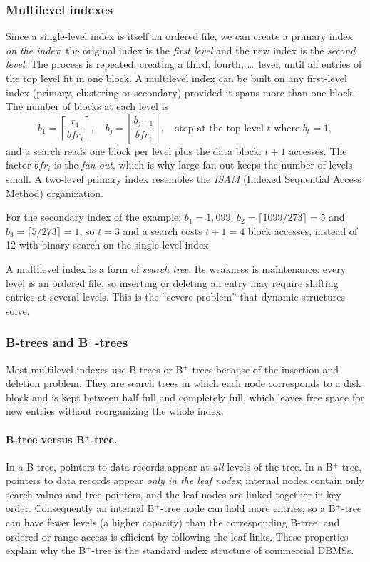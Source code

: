 \subsubsection{Multilevel indexes}
\label{sec:multilevel}
Since a single-level index is itself an ordered file, we can create a primary index \emph{on the
index}: the original index is the \emph{first level} and the new index is the \emph{second level}.
The process is repeated, creating a third, fourth, \dots\ level, until all entries of the top level
fit in one block. A multilevel index can be built on any first-level index (primary, clustering or
secondary) provided it spans more than one block. The number of blocks at each level is
\[
b_1 = \left\lceil \frac{r_1}{bfr_i} \right\rceil, \quad
b_{j} = \left\lceil \frac{b_{j-1}}{bfr_i} \right\rceil, \quad
\text{stop at the top level } t \text{ where } b_t = 1,
\]
and a search reads one block per level plus the data block: $t + 1$ accesses. The factor $bfr_i$ is
the \emph{fan-out}, which is why large fan-out keeps the number of levels small. A two-level
primary index resembles the \emph{ISAM} (Indexed Sequential Access Method) organization.

For the secondary index of the example: $b_1 = 1{,}099$, $b_2 = \lceil 1099/273 \rceil = 5$ and
$b_3 = \lceil 5/273 \rceil = 1$, so $t = 3$ and a search costs $t + 1 = 4$ block accesses, instead
of 12 with binary search on the single-level index.

A multilevel index is a form of \emph{search tree}. Its weakness is maintenance: every level is
an ordered file, so inserting or deleting an entry may require shifting entries at several levels.
This is the ``severe problem'' that dynamic structures solve.

\subsubsection{B-trees and B$^+$-trees}
\label{sec:btree}
Most multilevel indexes use B-trees or B$^+$-trees because of the insertion and deletion problem.
They are search trees in which each node corresponds to a disk block and is kept between half full
and completely full, which leaves free space for new entries without reorganizing the whole index.

\paragraph{B-tree versus B$^+$-tree.}
In a B-tree, pointers to data records appear at \emph{all} levels of the tree. In a B$^+$-tree,
pointers to data records appear \emph{only in the leaf nodes}; internal nodes contain only search
values and tree pointers, and the leaf nodes are linked together in key order. Consequently an
internal B$^+$-tree node can hold more entries, so a B$^+$-tree can have fewer levels (a higher
capacity) than the corresponding B-tree, and ordered or range access is efficient by following the
leaf links. These properties explain why the B$^+$-tree is the standard index structure of
commercial DBMSs.

